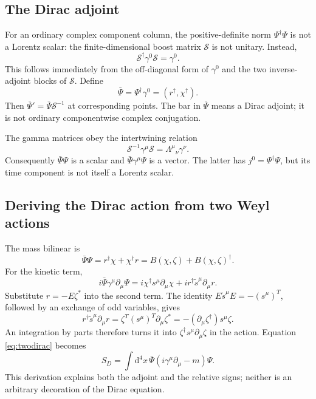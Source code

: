 \documentclass[11pt]{article}
\newcommand{\dd}{\mathrm{d}}
\begin{document}
\subsection{The Dirac adjoint}
For an ordinary complex component column, the positive-definite norm
\(\Psi^\dagger\Psi\) is not a Lorentz scalar:
the finite-dimensional boost matrix \(\mathcal S\) is not unitary.
Instead,
\begin{equation}
 \mathcal S^\dagger\gamma^0\mathcal S=\gamma^0.
 \label{eq:pseudounitary}
\end{equation}
This follows immediately from the off-diagonal form of \(\gamma^0\)
and the two inverse-adjoint blocks of \(\mathcal S\). Define
\begin{equation}
 \boxed{\bar\Psi=\Psi^\dagger\gamma^0=(r^\dagger,\chi^\dagger).}
 \label{eq:adjoint}
\end{equation}
Then \(\bar\Psi'\!=\bar\Psi\mathcal S^{-1}\) at corresponding
points. The bar in \(\bar\Psi\) means a Dirac adjoint; it is not
ordinary componentwise complex conjugation.

The gamma matrices obey the intertwining relation
\begin{equation}
 \mathcal S^{-1}\gamma^\mu\mathcal S
    =\Lambda^\mu{}_{\nu}\gamma^\nu.
 \label{eq:gammacov}
\end{equation}
Consequently \(\bar\Psi\Psi\) is a scalar and
\(\bar\Psi\gamma^\mu\Psi\) is a vector. The latter has
\(j^0=\Psi^\dagger\Psi\), but its time component is not itself a
Lorentz scalar.

\subsection{Deriving the Dirac action from two Weyl actions}
The mass bilinear is
\begin{equation}
 \bar\Psi\Psi=r^\dagger\chi+\chi^\dagger r
             =B(\chi,\zeta)+B(\chi,\zeta)^\dagger.
 \label{eq:massbilinear}
\end{equation}
For the kinetic term,
\begin{equation}
 i\bar\Psi\gamma^\mu\partial_\mu\Psi
  =i\chi^\dagger s^\mu\partial_\mu\chi
   +ir^\dagger\widetilde s^\mu\partial_\mu r.
 \label{eq:kinblocks}
\end{equation}
Substitute \(r=-E\zeta^*\) into the second term. The identity
\(E\widetilde s^\mu E=-(s^\mu)^T\), followed by an exchange of
odd variables, gives
\[
 r^\dagger\widetilde s^\mu\partial_\mu r
   =\zeta^T(s^\mu)^T\partial_\mu\zeta^*
   =-(\partial_\mu\zeta^\dagger)s^\mu\zeta.
\]
An integration by parts therefore turns it into
\(\zeta^\dagger s^\mu\partial_\mu\zeta\) in the action.
Equation \eqref{eq:twodirac} becomes
\begin{equation}
 \boxed{S_D=\int\dd^4x\,\bar\Psi(i\gamma^\mu\partial_\mu-m)\Psi.}
 \label{eq:diracaction}
\end{equation}
This derivation explains both the adjoint and the relative signs;
neither is an arbitrary decoration of the Dirac equation.
\end{document}
